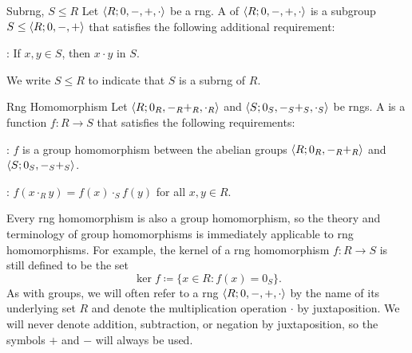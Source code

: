 \documentclass[12pt]{report}
\begin{document}
\begin{dfnbox}{Subrng, $S \le R$}
	Let ${\langle {R; 0, -, +, \cdot} \rangle}$ be a rng. A  of ${\langle {R; 0, -, +, \cdot} \rangle}$ is a subgroup $S \le {\langle {R; 0, -, +} \rangle}$ that satisfies the following additional requirement:
	\begin{dfnitems}
		\item {}: If $x, y \in S$, then $x \cdot y$ in $S$.
	\end{dfnitems}
	We write $S \le R$ to indicate that $S$ is a subrng of $R$.
\end{dfnbox}

\begin{dfnbox}{Rng Homomorphism}
	Let ${\langle {R; 0_R, -_R +_R, \cdot_R} \rangle}$ and ${\langle {S; 0_S, -_S +_S, \cdot_S} \rangle}$ be rngs. A  is a function $f: R \to S$ that satisfies the following requirements:
	\begin{dfnitems}
		\item {}: $f$ is a group homomorphism between the abelian groups ${\langle {R; 0_R, -_R +_R} \rangle}$ and ${\langle {S; 0_S, -_S +_S} \rangle}$.
		\item {}: $f(x \cdot_R y) = f(x) \cdot_S f(y)$ for all $x, y \in R$.
	\end{dfnitems}
\end{dfnbox}

Every rng homomorphism is also a group homomorphism, so the theory and terminology of group homomorphisms is immediately applicable to rng homomorphisms. For example, the kernel of a rng homomorphism $f: R \to S$ is still defined to be the set
\[ \ker f \coloneq \{ x \in R : f(x) = 0_S \}. \]
As with groups, we will often refer to a rng ${\langle {R; 0, -, +, \cdot} \rangle}$ by the name of its underlying set $R$ and denote the multiplication operation $\cdot$ by juxtaposition. We will never denote addition, subtraction, or negation by juxtaposition, so the symbols $+$ and $-$ will always be used.
\end{document}
